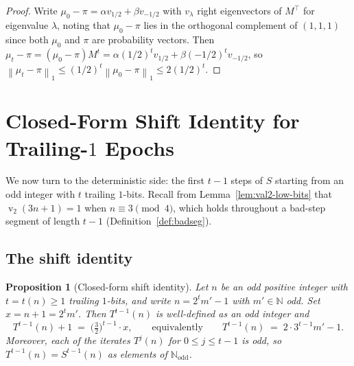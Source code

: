 \documentclass[11pt,a4paper]{article}
\newtheorem{proposition}[theorem]{Proposition}
\theoremstyle{definition}
\theoremstyle{remark}
\DeclareMathOperator{\val}{v}
\newcommand{\N}{\mathbb{N}}
\newcommand{\Nodd}{\N_{\mathrm{odd}}}
\newcommand{\norm}[1]{\left\|#1\right\|}
\begin{document}
\begin{proof}
Write $\mu_0 - \pi = \alpha v_{1/2} + \beta v_{-1/2}$ with $v_\lambda$
right eigenvectors of $M^\top$ for eigenvalue $\lambda$, noting that
$\mu_0 - \pi$ lies in the orthogonal complement of $(1,1,1)$ since both
$\mu_0$ and $\pi$ are probability vectors.  Then
$\mu_t - \pi = (\mu_0 - \pi) M^t = \alpha (1/2)^t v_{1/2}
+ \beta (-1/2)^t v_{-1/2}$, so
$\norm{\mu_t - \pi}_1 \leq (1/2)^t \norm{\mu_0 - \pi}_1
\leq 2 (1/2)^t$.
\end{proof}

\section{Closed-Form Shift Identity for Trailing-$1$ Epochs}
\label{sec:shift}

We now turn to the deterministic side: the first $t-1$ steps of $S$
starting from an odd integer with $t$ trailing $1$-bits.  Recall from
Lemma~\ref{lem:val2-low-bits} that $\val_2(3n+1) = 1$ when
$n \equiv 3 \pmod 4$, which holds throughout a bad-step segment of
length $t-1$ (Definition~\ref{def:badseg}).

\subsection{The shift identity}

\begin{proposition}[Closed-form shift identity]\label{prop:shift}
Let $n$ be an odd positive integer with $t = t(n) \geq 1$ trailing
$1$-bits, and write $n = 2^t m' - 1$ with $m' \in \N$ odd.  Set
$x = n + 1 = 2^t m'$.  Then $T^{t-1}(n)$ is well-defined as an odd
integer and
\begin{equation}\label{eq:shift}
  T^{t-1}(n) + 1 \;=\; \bigl(\tfrac{3}{2}\bigr)^{t-1} \cdot x,
  \qquad
  \text{equivalently}\qquad
  T^{t-1}(n) \;=\; 2 \cdot 3^{t-1} m' - 1.
\end{equation}
Moreover, each of the iterates $T^j(n)$ for $0 \leq j \leq t - 1$ is
odd, so $T^{t-1}(n) = S^{t-1}(n)$ as elements of $\Nodd$.
\end{proposition}
\end{document}
